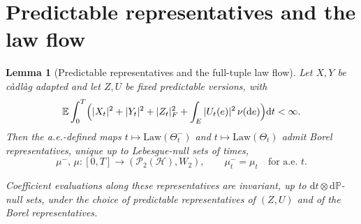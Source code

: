 \documentclass[preprint,12pt]{elsarticle}
\makeatletter
\newcommand{\E}{\mathbb{E}}
\newcommand{\Prob}{\mathbb{P}}
\newcommand{\diff}{\mathrm{d}}
\newcommand{\Law}{\mathrm{Law}}
\numberwithin{equation}{section}
\theoremstyle{plain}
\newtheorem{lemma}[theorem]{Lemma}
\theoremstyle{definition}
\theoremstyle{\PaperRemarkStyle}
\let\PaperOrigAppendix\appendix
\renewcommand{\appendix}{\PaperOrigAppendix\gdef\thesection{\@Alph\c@section}}
\makeatother
\begin{document}
 \clearpage
\appendix
\section{Predictable representatives and the law flow}\label{app:lawflow}

\begin{lemma}[Predictable representatives and the full-tuple law flow]\label{lem:lawflow}
Let $X,Y$ be c\`adl\`ag adapted and let $Z,U$ be fixed predictable versions, with
\[
\E\int_0^T\Bigl(|X_t|^2+|Y_t|^2+|Z_t|_F^2+\int_E|U_t(e)|^2\,\nu(\diff e)\Bigr)\diff t
<\infty .
\]
Then the a.e.-defined maps
$t\mapsto\Law(\Theta_t^-)$ and $t\mapsto\Law(\Theta_t)$ admit Borel representatives,
unique up to Lebesgue-null sets of times,
\[
\mu^-,\,\mu:[0,T]\to(\mathcal P_2(\mathcal H),W_2),
\qquad
\mu_t^-=\mu_t\quad\text{for a.e.\ }t .
\]

Coefficient evaluations along these representatives are invariant, up to
$\diff t\otimes\diff\Prob$-null sets, under the choice of predictable representatives of
$(Z,U)$ and of the Borel representatives.
\end{lemma}
\end{document}
